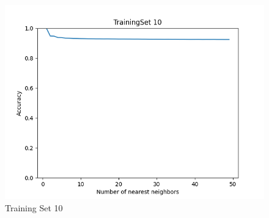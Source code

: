 \documentclass{article}
\begin{document}
\begin{figure}[H]
        \centering
	\begin{minipage}{.33\textwidth}
			\centering
			\includegraphics[width=1\linewidth]{../KNN_TrainingSet 10.png}
			\caption{Training Set 10}
	\end{minipage}\hfill
\end{figure}
\end{document}
